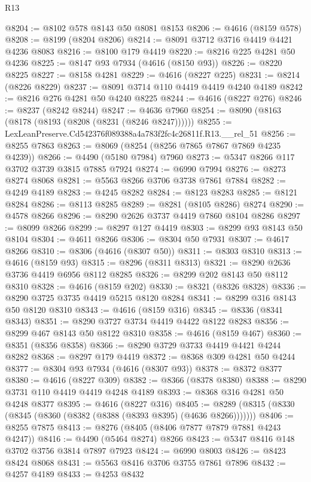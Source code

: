 \begin{lexlean}{R13}
\begin{coremodule}
@8204 := @8102 @578 @8143 @50 @8081 @8153
@8206 := @4616 (@8159 @578)
@8208 := @8199 (@8204 @8206)
@8214 := @8091 @3712 @3716 @4419 @4421 @4236 @8083
@8216 := @8100 @179 @4419
@8220 := @8216 @225 @4281 @50 @4236
@8225 := @8147 @93 @7934 (@4616 (@8150 @93))
@8226 := @8220 @8225
@8227 := @8158 @4281
@8229 := @4616 (@8227 @225)
@8231 := @8214 (@8226 @8229)
@8237 := @8091 @3714 @110 @4419 @4419 @4240 @4189
@8242 := @8216 @276 @4281 @50 @4240 @8225
@8244 := @4616 (@8227 @276)
@8246 := @8237 (@8242 @8244)
@8247 := @4636 @7960
@8254 := @8090 (@8163 (@8178 (@8193 (@8208 (@8231 (@8246 @8247))))))
@8255 := LexLeanPreserve.Cd542376f089388a4a783f2fc4c26811f.R13.__rel_51
@8256 := @8255 @7863
@8263 := @8069 (@8254 (@8256 @7865 @7867 @7869 @4235 @4239))
@8266 := @4490 (@5180 @7984) @7960
@8273 := @5347 @8266 @117 @3702 @3739 @3815 @7885 @7924
@8274 := @6990 @7994
@8276 := @8273 @8274 @8068
@8281 := @5563 @8266 @3706 @3738 @7861 @7884
@8282 := @4249 @4189
@8283 := @4245 @8282
@8284 := @8123 @8283
@8285 := @8121 @8284
@8286 := @8113 @8285
@8289 := @8281 (@8105 @8286) @8274
@8290 := @4578 @8266
@8296 := @8290 @2626 @3737 @4419 @7860 @8104 @8286
@8297 := @8099 @8266
@8299 := @8297 @127 @4419
@8303 := @8299 @93 @8143 @50 @8104
@8304 := @4611 @8266
@8306 := @8304 @50 @7931
@8307 := @4617 @8266
@8310 := @8306 (@4616 (@8307 @50))
@8311 := @8303 @8310
@8313 := @4616 (@8159 @93)
@8315 := @8296 (@8311 @8313)
@8321 := @8290 @2636 @3736 @4419 @6956 @8112 @8285
@8326 := @8299 @202 @8143 @50 @8112 @8310
@8328 := @4616 (@8159 @202)
@8330 := @8321 (@8326 @8328)
@8336 := @8290 @3725 @3735 @4419 @5215 @8120 @8284
@8341 := @8299 @316 @8143 @50 @8120 @8310
@8343 := @4616 (@8159 @316)
@8345 := @8336 (@8341 @8343)
@8351 := @8290 @3727 @3734 @4419 @4422 @8122 @8283
@8356 := @8299 @467 @8143 @50 @8122 @8310
@8358 := @4616 (@8159 @467)
@8360 := @8351 (@8356 @8358)
@8366 := @8290 @3729 @3733 @4419 @4421 @4244 @8282
@8368 := @8297 @179 @4419
@8372 := @8368 @309 @4281 @50 @4244
@8377 := @8304 @93 @7934 (@4616 (@8307 @93))
@8378 := @8372 @8377
@8380 := @4616 (@8227 @309)
@8382 := @8366 (@8378 @8380)
@8388 := @8290 @3731 @110 @4419 @4419 @4248 @4189
@8393 := @8368 @316 @4281 @50 @4248 @8377
@8395 := @4616 (@8227 @316)
@8405 := @8289 (@8315 (@8330 (@8345 (@8360 (@8382 (@8388 (@8393 @8395) (@4636 @8266)))))))
@8406 := @8255 @7875
@8413 := @8276 (@8405 (@8406 @7877 @7879 @7881 @4243 @4247))
@8416 := @4490 (@5464 @8274) @8266
@8423 := @5347 @8416 @148 @3702 @3756 @3814 @7897 @7923
@8424 := @6990 @8003
@8426 := @8423 @8424 @8068
@8431 := @5563 @8416 @3706 @3755 @7861 @7896
@8432 := @4257 @4189
@8433 := @4253 @8432

\end{coremodule}
\end{lexlean}
